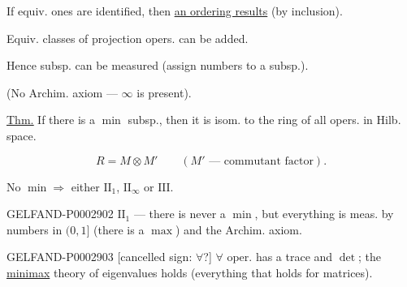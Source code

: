 If equiv. ones are identified, then \underline{an ordering results} (by inclusion).

Equiv. classes of projection opers. can be added.

Hence subsp. can be measured (assign numbers to a subsp.).

(No Archim. axiom --- $\infty$ is present).

\underline{\underline{Thm.}} If there is a $\min$ subsp., then it is isom. to the ring of all opers. in Hilb. space.

\begin{equation*}R=M\otimes M'\qquad (M'\text{ --- commutant factor}).\end{equation*}

No $\min\Longrightarrow$ either $\mathrm{II}_1$, $\mathrm{II}_\infty$ or $\mathrm{III}$.

\begin{GelfandAdjacentEvidence}{GELFAND-P000290}{2}
$\mathrm{II}_1$ --- there is never a $\min$, but everything is meas. by numbers in $(0,1]$ (there is a $\max$) and the Archim. axiom.









\end{GelfandAdjacentEvidence}


\begin{GelfandAdjacentEvidence}{GELFAND-P000290}{3}
[cancelled sign: $\forall$?] $\forall$ oper. has a trace and $\det$; the \underline{minimax} theory of eigenvalues holds (everything that holds for matrices).

\end{GelfandAdjacentEvidence}



